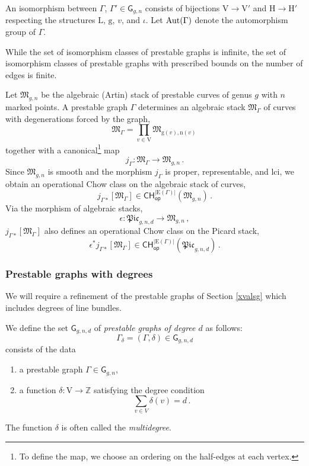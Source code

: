 \documentclass[a4paper,12pt]{article} %
\def\Aut{{\rm Aut}}
\def\E{\mathrm{E}}
\def\n{\mathrm{n}}
\def\L{\mathrm{L}}
\def\V{\mathrm{V}}
\def\H{\mathrm{H}}
\def\g{\mathrm{g}}
\def\G{\mathsf{G}}
\theoremstyle{definition}
\theoremstyle{plain}%
\newcommand{\Picabs}{\mathfrak{Pic}}
\begin{document}
An isomorphism between $\Gamma$, $\Gamma' \in \G_{g,n}$ 
consists of bijections $\V \to \V'$ and $\H \to \H'$ respecting the
structures $\L$, $\mathrm{g}$, $v$, and $\iota$.
Let $\Aut(\Gamma)$ denote the automorphism group of $\Gamma$.



While the set of isomorphism classes of prestable graphs is infinite, the set of isomorphism classes of prestable graphs with prescribed bounds on the number of edges is finite.



Let $\mathfrak{M}_{g,n}$ be the algebraic (Artin) stack of prestable curves of genus $g$ with $n$ marked points.
A prestable graph $\Gamma$ determines an algebraic stack $\mathfrak{M}_\Gamma$ of 
curves
with degenerations forced by the graph,
$$
\mathfrak{M}_\Gamma = \prod_{v \in \V} \mathfrak{M}_{\g(v), \n(v)}\, $$
together with a 
canonical\footnote{To define the map, we choose an ordering on the half-edges at each vertex. } map
$$j_\Gamma : \mathfrak{M}_\Gamma \to \mathfrak{M}_{g,n}\, .$$
Since $\mathfrak{M}_{g,n}$ is smooth and
the morphism $j_\Gamma$ is proper, representable, and lci, we obtain an operational Chow class on the algebraic
stack of curves,
$$j_{\Gamma*}[\mathfrak{M}_\Gamma] \in \mathsf{CH}_{\mathsf{op}}^{|\E(\Gamma)|}(\mathfrak{M}_{g,n})\, .$$
Via the morphism of algebraic stacks,
$$\epsilon: \Picabs_{g,n,d} \rightarrow \mathfrak{M}_{g,n}\, ,$$
$j_{\Gamma*}[\mathfrak{M}_\Gamma]$ also defines an operational Chow class
on the Picard stack,
$$\epsilon^* j_{\Gamma*}[\mathfrak{M}_\Gamma] \in \mathsf{CH}_{\mathsf{op}}^{|\E(\Gamma)|}(\Picabs_{g,n,d})\, .$$

\subsubsection{Prestable graphs with degrees} \label{Sect:Prestgrwdeg}
We will require a refinement of the prestable graphs of Section \ref{xvalsg} which includes degrees
of line bundles. 

We define the set $\G_{g,n,d}$ of {\em prestable graphs of degree $d$} as
follows: $$\Gamma_\delta=(\Gamma,\delta) \in \G_{g,n,d}$$ consists of the data
\begin{enumerate}
    \item[$\bullet$] a prestable graph $\Gamma\in \mathsf{G}_{g,n}$,
    \item[$\bullet$] a function $\delta: \V \rightarrow \mathbb{Z}$
    satisfying the degree condition
$$\sum_{v\in V} \delta(v) = d\, .$$
\end{enumerate}
The function $\delta$ is  often called the {\em multidegree}.
\end{document}
